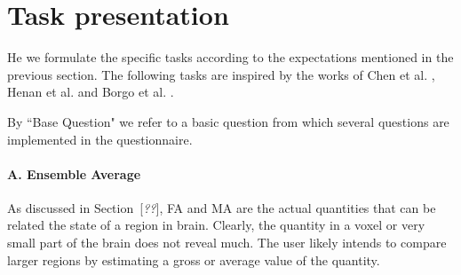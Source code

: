 \documentclass[a4paper, 12pt]{report}
\newcommand{\comment}[1]{{\color{red}[\textit{#1}]}}
\begin{document}
\section{Task presentation}
He we formulate the specific tasks according to the expectations mentioned in the previous section. The following tasks are inspired by the works of Chen et al. \cite{chen}, Henan et al. \cite{henan} and Borgo et al. \cite{borgo}.

By ``Base Question" we refer to a basic question from which several questions are implemented in the questionnaire.

\paragraph{A. Ensemble Average}

As discussed in Section~\comment{??}, FA and MA are the actual quantities that can be related the state of a region in brain. Clearly, the quantity in a voxel or very small part of the brain does not reveal much. The user likely intends to compare larger regions by estimating a gross or average value of the quantity.
\end{document}
